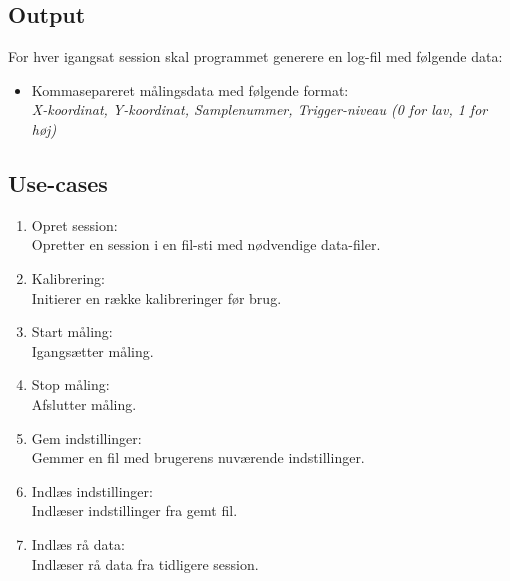 \documentclass[rapport.tex]{subfiles}
\begin{document}
	
	
	\subsection{Output}
	For hver igangsat session skal programmet generere en log-fil med følgende data:
	\indent \begin{itemize}
		
		\item 	Kommasepareret målingsdata med følgende format: \\
		\textit{X-koordinat, Y-koordinat, Samplenummer, Trigger-niveau (0 for lav, 1 for høj)} 
	\end{itemize}
	
	\subsection{Use-cases}	
	\label{usec}
	\begin{enumerate}
		\item Opret session: \\Opretter en session i en fil-sti med nødvendige data-filer. 
		\item Kalibrering: \\Initierer en række kalibreringer før brug. 
		\item Start måling: \\Igangsætter måling.
		\item Stop måling: \\Afslutter måling.
		\item Gem indstillinger: \\Gemmer en fil med brugerens nuværende indstillinger.
		\item Indlæs indstillinger: \\Indlæser indstillinger fra gemt fil.
		\item Indlæs rå data: \\Indlæser rå data fra tidligere session. 
	\end{enumerate}
\end{document}

